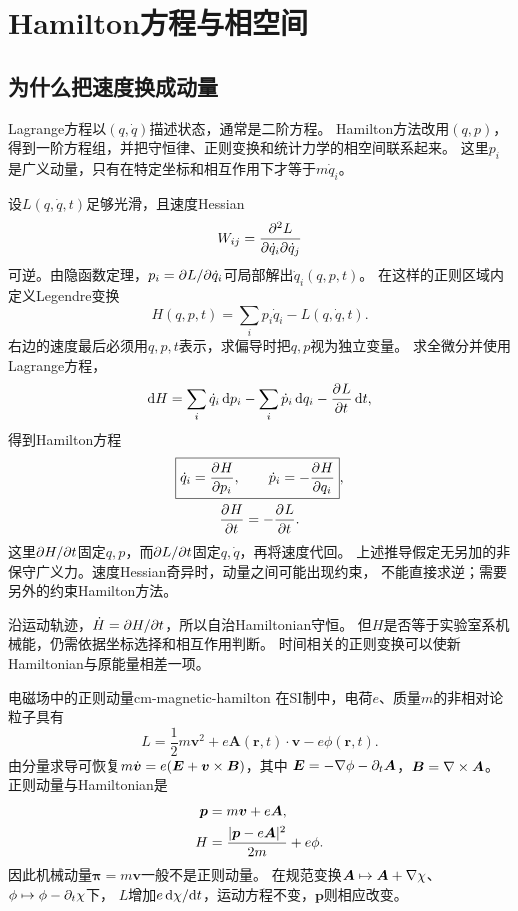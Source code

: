 \chapter{Hamilton方程与相空间}

\section{为什么把速度换成动量}
Lagrange方程以$(q,\dot q)$描述状态，通常是二阶方程。
Hamilton方法改用$(q,p)$，得到一阶方程组，并把守恒律、正则变换和统计力学的相空间联系起来。
这里$p_i$是广义动量，只有在特定坐标和相互作用下才等于$m\dot q_i$。

设$L(q,\dot q,t)$足够光滑，且速度Hessian
\begin{equation}
 W_{ij} = \frac{\partial^2L}{\partial\dot q_i\partial\dot q_j}
\end{equation}
可逆。由隐函数定理，$p_i = \partial L/\partial\dot q_i$可局部解出$\dot q_i(q,p,t)$。
在这样的正则区域内定义Legendre变换
\begin{equation}
 H(q,p,t) = \sum_i p_i\dot q_i - L(q,\dot q,t).
\end{equation}
右边的速度最后必须用$q,p,t$表示，求偏导时把$q,p$视为独立变量。
求全微分并使用Lagrange方程，
\begin{equation}
 \mathop{}\!\mathrm{d} H = \sum_i\dot q_i\mathop{}\!\mathrm{d} p_i - \sum_i\dot p_i\mathop{}\!\mathrm{d} q_i - \frac{\partial^{}L}{\partial{t}^{}}\mathop{}\!\mathrm{d} t,
\end{equation}
得到Hamilton方程
\begin{subequations}
 \begin{gather}
  \boxed{\dot q_i = \frac{\partial^{}H}{\partial{p_i}^{}},\qquad \dot p_i = -\frac{\partial^{}H}{\partial{q_i}^{}}}, \label{eq:cm-hamilton}\\
  \frac{\partial^{}H}{\partial{t}^{}} = -\frac{\partial^{}L}{\partial{t}^{}}.
 \end{gather}
\end{subequations}
这里$\partial H/\partial t$固定$q,p$，而$\partial L/\partial t$固定$q,\dot q$，再将速度代回。
上述推导假定无另加的非保守广义力。速度Hessian奇异时，动量之间可能出现约束，
不能直接求逆；需要另外的约束Hamilton方法。

沿运动轨迹，$\dot H = \partial H/\partial t$，所以自治Hamiltonian守恒。
但$H$是否等于实验室系机械能，仍需依据坐标选择和相互作用判断。
时间相关的正则变换可以使新Hamiltonian与原能量相差一项。

\begin{example}{电磁场中的正则动量}{cm-magnetic-hamilton}
在SI制中，电荷$e$、质量$m$的非相对论粒子具有
\begin{equation}
 L = \frac12m\bm v^2 + e\bm A(\bm r,t) \cdot \bm v - e\phi(\bm r,t).
\end{equation}
由分量求导可恢复$ m\dot{\bm{v}} = e(\bm E + \bm v \times \bm B)$，其中
$\bm E = -\nabla\phi - \partial_t\bm A$，$\bm B = \nabla\times\bm A$。
正则动量与Hamiltonian是
\begin{subequations}
 \begin{align}
  \bm p &= m\bm v + e\bm A,\\
  H &= \frac{\lvert\bm p - e\bm A\rvert^2}{2m} + e\phi.
 \end{align}
\end{subequations}
因此机械动量$\bm\pi = m\bm v$一般不是正则动量。
在规范变换$\bm A \mapsto \bm A + \nabla\chi$、$\phi \mapsto \phi - \partial_t\chi$下，
$L$增加$e\mathop{}\!\mathrm{d}\chi/\mathrm{d} t$，运动方程不变，$\bm p$则相应改变。
\end{example}

